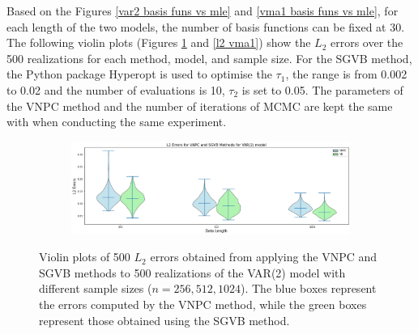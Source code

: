 \documentclass[%
 reprint,
 amsmath,amssymb,
 aps,
]{revtex4-2}
\begin{document}
Based on the Figures \ref{var2 basis funs vs mle} and \ref{vma1 basis funs vs mle}, for each length of the two models, the number of basis functions can be fixed at 30. The following violin plots (Figures \ref{l2 var2} and \ref{l2 vma1}) show the  $L_2$ errors over the 500 realizations for each method, model, and sample size. For the SGVB method, the Python package Hyperopt is used to optimise the $\tau_1$, the range is from 0.002 to 0.02 and the number of evaluations is 10, $\tau_2$ is set to 0.05.
The parameters of the VNPC method and the number of iterations of MCMC are kept the same with \cite{LiuYixuan2024Ancl}  when conducting the same experiment. 
\begin{figure}
\centering
\begin{subfigure}{\textwidth} %
  \centering
  \includegraphics[width=18cm]{L2 errors var2.png}
\end{subfigure}

\caption{
Violin plots of 500  $L_2$ errors obtained from applying the VNPC and SGVB methods to 500 realizations of the VAR(2) model with different sample sizes ($n = 256, 512, 1024$). The blue boxes represent the errors computed by the VNPC method, while the green boxes represent those obtained using the SGVB method.}
\label{l2 var2}
\end{figure}

\end{document}
